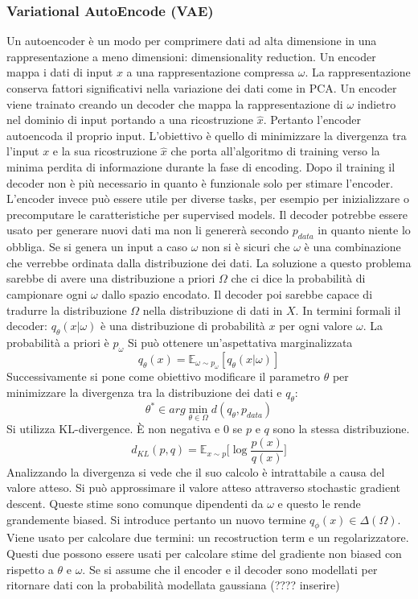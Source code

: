 		\subsubsection{Variational AutoEncode (VAE)}
		Un autoencoder \`e un modo per comprimere dati ad alta dimensione in una rappresentazione a meno dimensioni: dimensionality reduction.
		Un encoder mappa i dati di input $x$ a una rappresentazione compressa $\omega$.
		La rappresentazione conserva fattori significativi nella variazione dei dati come in PCA.
		Un encoder viene trainato creando un decoder che mappa la rappresentazione di $\omega$ indietro nel dominio di input portando a una ricostruzione $\hat{x}$.
		Pertanto l'encoder autoencoda il proprio input.
		L'obiettivo \`e quello di minimizzare la divergenza tra l'input $x$ e la sua ricostruzione $\hat{x}$ che porta all'algoritmo di training verso la minima perdita di informazione durante la fase di encoding.
		Dopo il training il decoder non \`e pi\`u necessario in quanto \`e funzionale solo per stimare l'encoder.
		L'encoder invece pu\`o essere utile per diverse tasks, per esempio per inizializzare o precomputare le caratteristiche per supervised models.
		Il decoder potrebbe essere usato per generare nuovi dati ma non li generer\`a secondo $p_{data}$ in quanto niente lo obbliga.
		Se si genera un input a caso $\omega$ non si \`e sicuri che $\omega$ \`e una combinazione che verrebbe ordinata dalla distribuzione dei dati.
		La soluzione a questo problema sarebbe di avere una distribuzione a priori $\Omega$ che ci dice la probabilit\`a di campionare ogni $\omega$ dallo spazio encodato.
		Il decoder poi sarebbe capace di tradurre la distribuzione $\Omega$ nella distribuzione di dati in $X$.
		In termini formali il decoder: $q_\theta(x|\omega)$ \`e una distribuzione di probabilit\`a $x$ per ogni valore $\omega$.
		La probabilit\`a a priori \`e $p_\omega$
		Si pu\`o ottenere un'aspettativa marginalizzata
		$$q_\theta(x) = \mathbb{E}_{\omega\sim p_\omega}[q_\theta(x|\omega)]$$
		Successivamente si pone come obiettivo modificare il parametro $\theta$ per minimizzare la divergenza tra la distribuzione dei dati e $q_\theta$:
		$$\theta^*\in arg\min\limits_{\theta\in\Omega}d(q_\theta,p_{data})$$
		Si utilizza KL-divergence.
		\`E non negativa e $0$ se $p$ e $q$ sono la stessa distribuzione.
		$$d_{KL}(p,q) = \mathbb{E}_{x\sim p}\bigl[\log\frac{p(x)}{q(x)}\bigr]$$
		Analizzando la divergenza si vede che il suo calcolo \`e intrattabile a causa del valore atteso.
		Si pu\`o approssimare il valore atteso attraverso stochastic gradient descent.
		Queste stime sono comunque dipendenti da $\omega$ e questo le rende grandemente biased.
		Si introduce pertanto un nuovo termine $q_\phi(x)\in\Delta(\Omega)$.
		Viene usato per calcolare due termini: un recostruction term e un regolarizzatore.
		Questi due possono essere usati per calcolare stime del gradiente non biased con rispetto a $\theta$ e $\omega$.
		Se si assume che il encoder e il decoder sono modellati per ritornare dati con la probabilit\`a modellata gaussiana (???? inserire)

